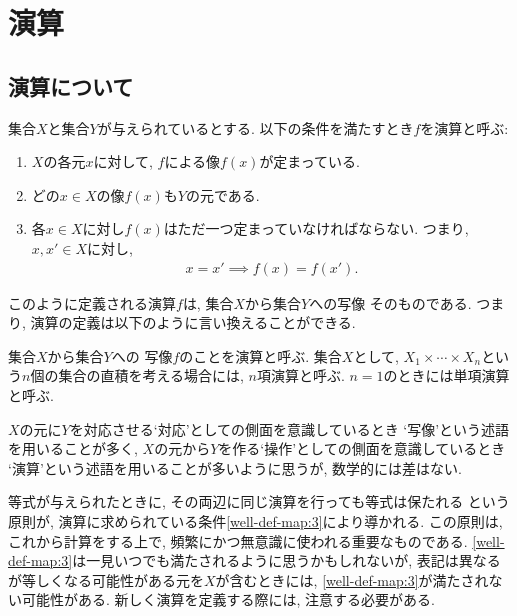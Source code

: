 \chapter{演算}
\section{演算について}
集合$X$と集合$Y$が与えられているとする.
以下の条件を満たすとき$f$を演算と呼ぶ:
\begin{enumerate}
 \item 
 \label{well-def-map:1}
 $X$の各元$x$に対して, $f$による像$f(x)$が定まっている.
 \item 
 \label{well-def-map:2}
 どの$x\in X$の像$f(x)$も$Y$の元である.
 \item 
\label{well-def-map:3}
各$x\in X$に対し$f(x)$はただ一つ定まっていなければならない.
つまり, $x,x'\in X$に対し,
 \begin{align*}
  x=x'\implies f(x)=f(x').
 \end{align*}
\end{enumerate}
このように定義される演算$f$は,
集合$X$から集合$Y$への写像
そのものである.
つまり, 演算の定義は以下のように言い換えることができる.
\begin{definition}
集合$X$から集合$Y$への
写像$f$のことを演算と呼ぶ.
集合$X$として, $X_1\times \cdots \times X_n$という$n$個の集合の直積を考える場合には,
$n$項演算と呼ぶ.
$n=1$のときには単項演算と呼ぶ.
\end{definition}
$X$の元に$Y$を対応させる`対応'としての側面を意識しているとき
`写像'という述語を用いることが多く,
$X$の元から$Y$を作る`操作'としての側面を意識しているとき
`演算'という述語を用いることが多いように思うが,
数学的には差はない.

等式が与えられたときに,
その両辺に同じ演算を行っても等式は保たれる
という原則が,
演算に求められている条件\cref{well-def-map:3}により導かれる.
この原則は,
これから計算をする上で,
頻繁にかつ無意識に使われる重要なものである.
\cref{well-def-map:3}は一見いつでも満たされるように思うかもしれないが,
表記は異なるが等しくなる可能性がある元を$X$が含むときには,
\cref{well-def-map:3}が満たされない可能性がある.
新しく演算を定義する際には,
注意する必要がある.

